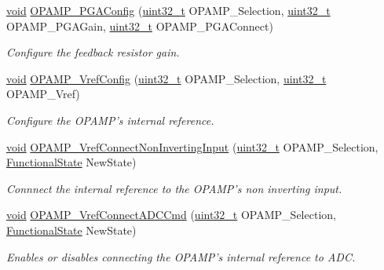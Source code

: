 \begin{DoxyCompactItemize}
\hyperlink{group___n_a_m_e_ga18028b8badbf1ea7e704ccac3c488e82}{void} \hyperlink{group___o_p_a_m_p___group1_gacb2fa995bd31564778508406f4da0397}{O\-P\-A\-M\-P\-\_\-\-P\-G\-A\-Config} (\hyperlink{stdint_8h_a435d1572bf3f880d55459d9805097f62}{uint32\-\_\-t} O\-P\-A\-M\-P\-\_\-\-Selection, \hyperlink{stdint_8h_a435d1572bf3f880d55459d9805097f62}{uint32\-\_\-t} O\-P\-A\-M\-P\-\_\-\-P\-G\-A\-Gain, \hyperlink{stdint_8h_a435d1572bf3f880d55459d9805097f62}{uint32\-\_\-t} O\-P\-A\-M\-P\-\_\-\-P\-G\-A\-Connect)
\begin{DoxyCompactList}\small\item\em Configure the feedback resistor gain. \end{DoxyCompactList}\item 
\hyperlink{group___n_a_m_e_ga18028b8badbf1ea7e704ccac3c488e82}{void} \hyperlink{group___o_p_a_m_p___group1_gafda4e9c439f856b12391f6f3036dfecd}{O\-P\-A\-M\-P\-\_\-\-Vref\-Config} (\hyperlink{stdint_8h_a435d1572bf3f880d55459d9805097f62}{uint32\-\_\-t} O\-P\-A\-M\-P\-\_\-\-Selection, \hyperlink{stdint_8h_a435d1572bf3f880d55459d9805097f62}{uint32\-\_\-t} O\-P\-A\-M\-P\-\_\-\-Vref)
\begin{DoxyCompactList}\small\item\em Configure the O\-P\-A\-M\-P's internal reference. \end{DoxyCompactList}\item 
\hyperlink{group___n_a_m_e_ga18028b8badbf1ea7e704ccac3c488e82}{void} \hyperlink{group___o_p_a_m_p___group1_ga8f71e81ecc647c4b7d6388b8ec609911}{O\-P\-A\-M\-P\-\_\-\-Vref\-Connect\-Non\-Inverting\-Input} (\hyperlink{stdint_8h_a435d1572bf3f880d55459d9805097f62}{uint32\-\_\-t} O\-P\-A\-M\-P\-\_\-\-Selection, \hyperlink{group___exported__types_gac9a7e9a35d2513ec15c3b537aaa4fba1}{Functional\-State} New\-State)
\begin{DoxyCompactList}\small\item\em Connnect the internal reference to the O\-P\-A\-M\-P's non inverting input. \end{DoxyCompactList}\item 
\hyperlink{group___n_a_m_e_ga18028b8badbf1ea7e704ccac3c488e82}{void} \hyperlink{group___o_p_a_m_p___group1_gafbd4b42c92fbbdad884283002636563a}{O\-P\-A\-M\-P\-\_\-\-Vref\-Connect\-A\-D\-C\-Cmd} (\hyperlink{stdint_8h_a435d1572bf3f880d55459d9805097f62}{uint32\-\_\-t} O\-P\-A\-M\-P\-\_\-\-Selection, \hyperlink{group___exported__types_gac9a7e9a35d2513ec15c3b537aaa4fba1}{Functional\-State} New\-State)
\begin{DoxyCompactList}\small\item\em Enables or disables connecting the O\-P\-A\-M\-P's internal reference to A\-D\-C. \end{DoxyCompactList}\item 

\end{DoxyCompactItemize}
